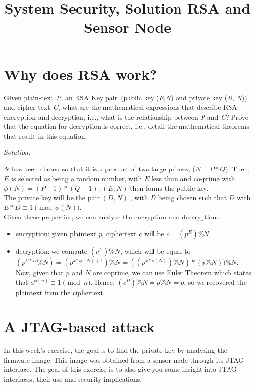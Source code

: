 \documentclass[a4paper,11pt]{article}
\title{System Security,
\ifsolution Solution \else \fi
RSA and Sensor Node}
\newenvironment{solution}%
{\par{\noindent\small\textit{Solution:}}\vspace{-12pt}\begin{framed}}%
{\end{framed}\par}
\begin{document}
\maketitle

\section{Why does RSA work?}
Given plain-text~\emph{P}, an RSA Key pair~(public key (\emph{E},\emph{N}) and
private key (\emph{D}, \emph{N})) and cipher-text~\emph{C}, what are the
mathematical expressions that describe RSA encryption and decryption, i.e.,
what is the relationship between \emph{P} and \emph{C}? Prove that the
equation for decryption is correct, i.e., detail the mathematical theorems
that result in this equation.
\ifsolution\begin{solution}
$N$ has been chosen so that it is a product of two large primes, ($N = P * Q$).
Then, $E$ is selected as being a random number, with $E$ less than and co-prime with
$\phi(N) = (P - 1) * (Q - 1)$. $(E, N)$ then forms the public key.\\
The private key will be the pair $(D, N)$ , with $D$ being chosen such that
$D$ with $E * D \equiv 1 \pmod{\phi(N)}$.\\
Given these properties, we can analyse the encryption and descryption.
\begin{itemize}
  \item encryption: given plaintext $p$, ciphertext $c$ will be $c = (p^E) \% N$.
  \item decryption: we compute $(c^D) \% N$, which will be equal to $(p^{E * D} \% N) =
  (p^{k * \phi(N) + 1}) \% N = ((p^{k * \phi(N)}) \% N) * (p \% N)) \% N$. Now, given
  that $p$ and $N$ are coprime, we can use Euler Theorem \cite{eulerth} which states
  that $a^{\phi(n)} \equiv 1 \pmod{n}$. Hence, $(c^D) \% N = p \% N = p$, so we recovered
  the plaintext from the ciphertext.
\end{itemize}

\end{solution}\fi

\section{A JTAG-based attack}
In this week's exercise, the goal is to find the private key by analyzing the
firmware image. This image was obtained from a sensor node through its JTAG
interface. The goal of this exercise is to also give you some insight into JTAG
interfaces, their use and security implications.
\end{document}
